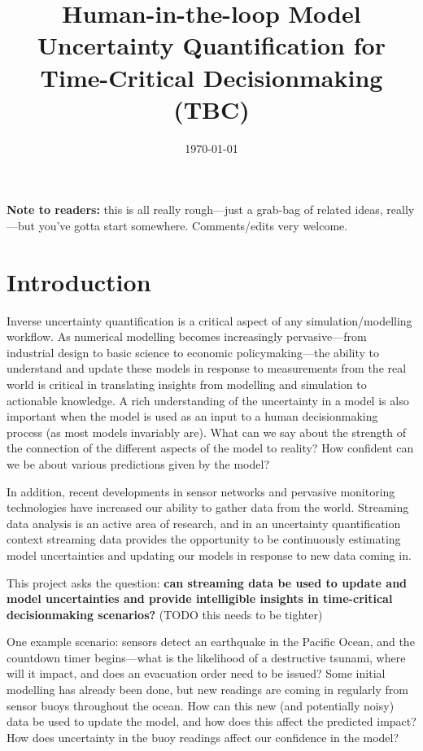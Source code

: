 \documentclass[a4paper,fontsize=12pt]{scrartcl}
\author{}
\date{\today}
\title{Human-in-the-loop Model Uncertainty Quantification for
  Time-Critical Decisionmaking (TBC)}
\begin{document}
\maketitle

\noindent
\textbf{Note to readers:} this is all really rough---just a grab-bag
of related ideas, really---but you've gotta start somewhere.
Comments/edits very welcome.

\section{Introduction}
\label{sec:introduction}

Inverse uncertainty quantification is a critical aspect of any
simulation/modelling workflow. As numerical modelling becomes
increasingly pervasive---from industrial design to basic science to
economic policymaking---the ability to understand and update these
models in response to measurements from the real world is critical in
translating insights from modelling and simulation to actionable
knowledge. A rich understanding of the uncertainty in a model is also
important when the model is used as an input to a human decisionmaking
process (as most models invariably are). What can we say about the
strength of the connection of the different aspects of the model to
reality? How confident can we be about various predictions given by
the model?

In addition, recent developments in sensor networks and pervasive
monitoring technologies have increased our ability to gather data from
the world. Streaming data analysis is an active area of research, and
in an uncertainty quantification context streaming data provides the
opportunity to be continuously estimating model uncertainties and
updating our models in response to new data coming in.

This project asks the question: \textbf{can streaming data be used to
  update and model uncertainties and provide intelligible insights in
  time-critical decisionmaking scenarios?} (TODO this needs to be
tighter)

One example scenario: sensors detect an earthquake in the Pacific Ocean,
and the countdown timer begins---what is the likelihood of a
destructive tsunami, where will it impact, and does an evacuation
order need to be issued? Some initial modelling has already been done,
but new readings are coming in regularly from sensor buoys throughout
the ocean. How can this new (and potentially noisy) data be used to
update the model, and how does this affect the predicted impact? How
does uncertainty in the buoy readings affect our confidence in the
model?
\end{document}
